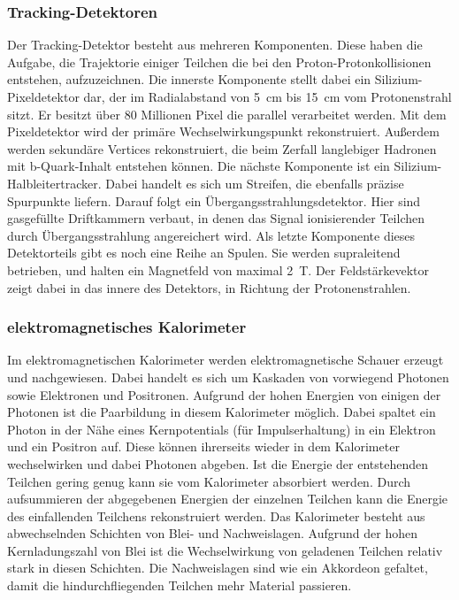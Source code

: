\subsubsection{Tracking-Detektoren}
Der Tracking-Detektor besteht aus mehreren Komponenten.
Diese haben die Aufgabe, die Trajektorie einiger Teilchen die bei den Proton-Protonkollisionen entstehen, aufzuzeichnen.
Die innerste Komponente stellt dabei ein Silizium-Pixeldetektor dar, der im Radialabstand von \SI{5}{\centi\meter} bis \SI{15}{\centi\meter} vom Protonenstrahl sitzt.
Er besitzt über 80 Millionen Pixel die parallel verarbeitet werden.
Mit dem Pixeldetektor wird der primäre Wechselwirkungspunkt rekonstruiert.
Außerdem werden sekundäre Vertices rekonstruiert, die beim Zerfall langlebiger Hadronen mit b-Quark-Inhalt entstehen können.
Die nächste Komponente ist ein Silizium-Halbleitertracker.
Dabei handelt es sich um Streifen, die ebenfalls präzise Spurpunkte liefern.
Darauf folgt ein Übergangsstrahlungsdetektor.
Hier sind gasgefüllte Driftkammern verbaut, in denen das Signal ionisierender Teilchen durch Übergangsstrahlung angereichert wird.
Als letzte Komponente dieses Detektorteils gibt es noch eine Reihe an Spulen.
Sie werden supraleitend betrieben, und halten ein Magnetfeld von maximal \SI{2}{\tesla}.
Der Feldstärkevektor zeigt dabei in das innere des Detektors, in Richtung der Protonenstrahlen.

\subsubsection{elektromagnetisches Kalorimeter}
Im elektromagnetischen Kalorimeter werden elektromagnetische Schauer erzeugt und nachgewiesen.
Dabei handelt es sich um Kaskaden von vorwiegend Photonen sowie Elektronen und Positronen.
Aufgrund der hohen Energien von einigen der Photonen ist die Paarbildung in diesem Kalorimeter möglich.
Dabei spaltet ein Photon in der Nähe eines Kernpotentials (für Impulserhaltung) in ein Elektron und ein Positron auf.
Diese können ihrerseits wieder in dem Kalorimeter wechselwirken und dabei Photonen abgeben.
Ist die Energie der entstehenden Teilchen gering genug kann sie vom Kalorimeter absorbiert werden.
Durch aufsummieren der abgegebenen Energien der einzelnen Teilchen kann die Energie des einfallenden Teilchens rekonstruiert werden.
Das Kalorimeter besteht aus abwechselnden Schichten von Blei- und Nachweislagen.
Aufgrund der hohen Kernladungszahl von Blei ist die Wechselwirkung von geladenen Teilchen relativ stark in diesen Schichten.
Die Nachweislagen sind wie ein Akkordeon gefaltet, damit die hindurchfliegenden Teilchen mehr Material passieren.

